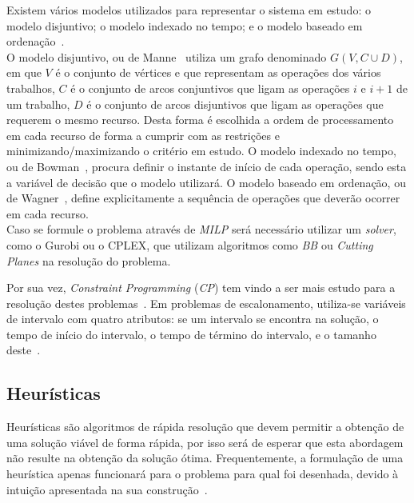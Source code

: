 Existem vários modelos utilizados para representar o sistema em estudo: o modelo disjuntivo; o modelo indexado no tempo; e o modelo baseado em ordenação~\cite{kuMixedIntegerProgramming2016}.\\

O modelo disjuntivo, ou de Manne~\cite{manneJobShopSchedulingProblem1960} utiliza um grafo denominado $G(V,C \cup D)$, em que $V$ é o conjunto de vértices e que representam as operações dos vários trabalhos, $C$ é o conjunto de arcos conjuntivos que ligam as operações $i$ e $i+1$ de um trabalho, $D$ é o conjunto de arcos disjuntivos que ligam as operações que requerem o mesmo recurso. Desta forma é escolhida a ordem de processamento em cada recurso de forma a cumprir com as restrições e minimizando/maximizando o critério em estudo. O modelo indexado no tempo, ou de Bowman~\cite{bowmanScheduleSequencingProblem1959}, procura definir o instante de início de cada operação, sendo esta a variável de decisão que o modelo utilizará. O modelo baseado em ordenação, ou de Wagner~\cite{wagnerIntegerLinearprogrammingModel1959}, define explicitamente a sequência de operações que deverão ocorrer em cada recurso.\\

Caso se formule o problema através de \textit{MILP} será necessário utilizar um \textit{solver}, como o Gurobi ou o CPLEX, que utilizam algoritmos como \textit{BB} ou \textit{Cutting Planes} na resolução do problema. 

Por sua vez, \textit{Constraint Programming} (\textit{CP}) tem vindo a ser mais estudo para a resolução destes problemas~\cite{dauzere-peresFlexibleJobShop2024}. Em problemas de escalonamento, utiliza-se variáveis de intervalo com quatro atributos: se um intervalo se encontra na solução, o tempo de início do intervalo, o tempo de término do intervalo, e o tamanho deste~\cite{kasapidisFlexibleJobShop2021}.\\

\subsection{Heurísticas}

Heurísticas são algoritmos de rápida resolução que devem permitir a obtenção de uma solução viável de forma rápida, por isso será de esperar que esta abordagem não resulte na obtenção da solução ótima. Frequentemente, a formulação de uma heurística apenas funcionará para o problema para qual foi desenhada, devido à intuição apresentada na sua construção~\cite{ezugwuMetaheuristicsComprehensiveOverview2021}.\\

